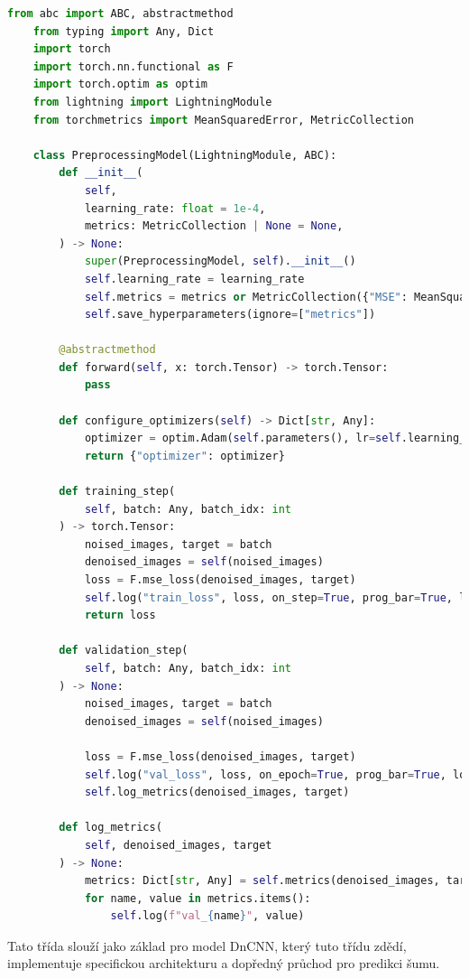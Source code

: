 \documentclass[male,czech,api_ing]{thesis}
\begin{document}
\begin{lstlisting}[language=Python, caption={Třída pro model redukující šum}, label={lst:PreprocessingClass}]
    from abc import ABC, abstractmethod
    from typing import Any, Dict
    import torch
    import torch.nn.functional as F
    import torch.optim as optim
    from lightning import LightningModule
    from torchmetrics import MeanSquaredError, MetricCollection

    class PreprocessingModel(LightningModule, ABC):
        def __init__(
            self,
            learning_rate: float = 1e-4,
            metrics: MetricCollection | None = None,
        ) -> None:
            super(PreprocessingModel, self).__init__()
            self.learning_rate = learning_rate
            self.metrics = metrics or MetricCollection({"MSE": MeanSquaredError()})
            self.save_hyperparameters(ignore=["metrics"])

        @abstractmethod
        def forward(self, x: torch.Tensor) -> torch.Tensor:
            pass

        def configure_optimizers(self) -> Dict[str, Any]:
            optimizer = optim.Adam(self.parameters(), lr=self.learning_rate)
            return {"optimizer": optimizer}

        def training_step(
            self, batch: Any, batch_idx: int
        ) -> torch.Tensor:
            noised_images, target = batch
            denoised_images = self(noised_images)
            loss = F.mse_loss(denoised_images, target)
            self.log("train_loss", loss, on_step=True, prog_bar=True, logger=True)
            return loss

        def validation_step(
            self, batch: Any, batch_idx: int
        ) -> None:
            noised_images, target = batch
            denoised_images = self(noised_images)

            loss = F.mse_loss(denoised_images, target)
            self.log("val_loss", loss, on_epoch=True, prog_bar=True, logger=True)
            self.log_metrics(denoised_images, target)

        def log_metrics(
            self, denoised_images, target
        ) -> None:
            metrics: Dict[str, Any] = self.metrics(denoised_images, target)
            for name, value in metrics.items():
                self.log(f"val_{name}", value)
\end{lstlisting}

Tato třída slouží jako základ pro model DnCNN, který tuto třídu zdědí, implementuje specifickou architekturu a dopředný průchod pro predikci šumu.
\end{document}
